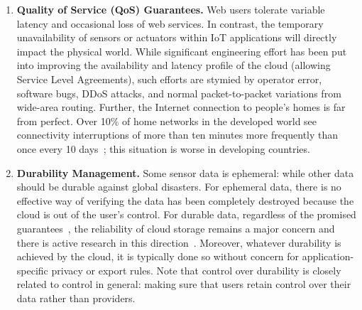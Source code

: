 \begin{enumerate}
\item \textbf{Quality of Service (QoS) Guarantees.} Web users tolerate
  variable latency and occasional loss of web services.  In contrast, the
  temporary unavailability of sensors or actuators within IoT applications will
  directly impact the physical world.  While significant engineering effort has
  been put into improving the availability and latency profile of the cloud
  (allowing Service Level Agreements), such efforts are stymied by operator
  error, software bugs, DDoS attacks, and normal packet-to-packet variations
  from wide-area routing. Further, the Internet connection to people's homes is
  far from perfect.  Over 10\% of home networks in the developed world see
  connectivity interruptions of more than ten minutes more frequently than once
  every 10 days~\cite{grover2013peeking}; this situation is worse in developing
  countries.

\item \textbf{Durability Management.} Some sensor data is ephemeral: while other
  data should be durable against global disasters.  For ephemeral data, there is
  no effective way of verifying the data has been completely destroyed because
  the cloud is out of the user's control. For durable data, regardless of the
  promised guarantees~\cite{s3durability}, the reliability of cloud storage
  remains a major concern and there is active research in this
  direction~\cite{bessani2013depsky}.  Moreover, whatever durability is achieved
  by the cloud, it is typically done so without concern for application-specific
  privacy or export rules.  Note that control over durability is closely related
  to control in general: making sure that users retain control over their data
  rather than providers.

\end{enumerate}


